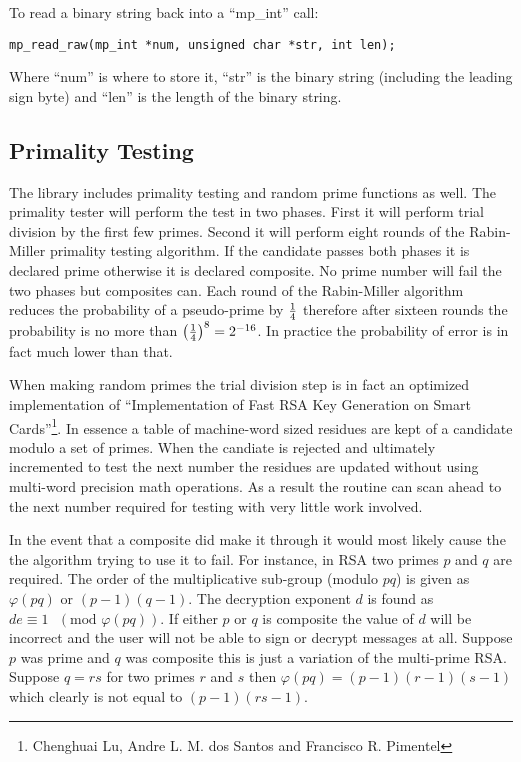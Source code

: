 \documentclass[a4paper]{book}
\def\phi{\varphi}
\begin{document}
To read a binary string back into a ``mp\_int'' call:
\begin{verbatim}
mp_read_raw(mp_int *num, unsigned char *str, int len);
\end{verbatim}
Where ``num'' is where to store it, ``str'' is the binary string (including the leading sign byte) and ``len'' is the 
length of the binary string.

\subsection{Primality Testing}
The library includes primality testing and random prime functions as well.  The primality tester will perform the test in
two phases.  First it will perform trial division by the first few primes.  Second it will perform eight rounds of the 
Rabin-Miller primality testing algorithm.  If the candidate passes both phases it is declared prime otherwise it is declared
composite.  No prime number will fail the two phases but composites can.  Each round of the Rabin-Miller algorithm reduces
the probability of a pseudo-prime by $1 \over 4$ therefore after sixteen rounds the probability is no more than 
$\left ( { 1 \over 4 } \right )^{8} = 2^{-16}$.  In practice the probability of error is in fact much lower than that.

When making random primes the trial division step is in fact an optimized implementation of ``Implementation of Fast RSA Key Generation on Smart Cards''\footnote{Chenghuai Lu, Andre L. M. dos Santos and Francisco R. Pimentel}.
In essence a table of machine-word sized residues are kept of a candidate modulo a set of primes.  When the candiate
is rejected and ultimately incremented to test the next number the residues are updated without using multi-word precision
math operations.  As a result the routine can scan ahead to the next number required for testing with very little work
involved.

In the event that a composite did make it through it would most likely cause the the algorithm trying to use it to fail.  For 
instance, in RSA two primes $p$ and $q$ are required.  The order of the multiplicative sub-group (modulo $pq$) is given 
as $\phi(pq)$ or $(p - 1)(q - 1)$.  The decryption exponent $d$ is found as $de \equiv 1\mbox{ }(\mbox{mod } \phi(pq))$.  If either $p$ or $q$ is composite the value of $d$ will be incorrect and the user
will not be able to sign or decrypt messages at all.  Suppose $p$ was prime and $q$ was composite this is just a variation of 
the multi-prime RSA.  Suppose $q = rs$ for two primes $r$ and $s$ then $\phi(pq) = (p - 1)(r - 1)(s - 1)$ which clearly is 
not equal to $(p - 1)(rs - 1)$.
\end{document}

